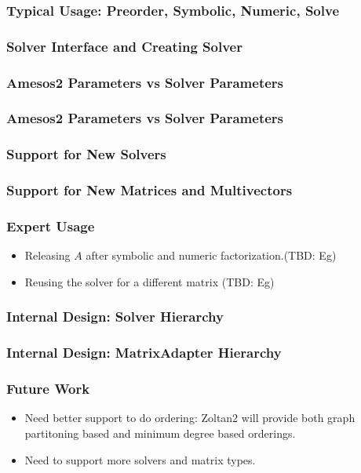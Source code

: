 \documentclass[xcolor=dvipsnames]{beamer}
\begin{document}
\begin{frame}
    \frametitle{Typical Usage: Preorder, Symbolic, Numeric, Solve}
\end{frame}

\begin{frame}
    \frametitle{Solver Interface and Creating Solver}
\end{frame}

\begin{frame}
    \frametitle{Amesos2 Parameters vs Solver Parameters}
\end{frame}

\begin{frame}
    \frametitle{Amesos2 Parameters vs Solver Parameters}
\end{frame}

\begin{frame}
    \frametitle{Support for New Solvers}
\end{frame}

\begin{frame}
    \frametitle{Support for New Matrices and Multivectors}
\end{frame}

\begin{frame}
    \frametitle{Expert Usage}
\begin{itemize}
    \item Releasing $A$ after symbolic and numeric factorization.(TBD: Eg)
    \item Reusing the solver for a different matrix (TBD: Eg)
\end{itemize}
\end{frame}

\begin{frame}
    \frametitle{Internal Design: Solver Hierarchy}
\end{frame}

\begin{frame}
    \frametitle{Internal Design: MatrixAdapter Hierarchy}
\end{frame}

\begin{frame}
    \frametitle{Future Work}
\begin{itemize}
    \item Need better support to do ordering: Zoltan2 will provide both
    graph partitoning based and minimum degree based orderings.
    \item Need to support more solvers and matrix types.
\end{itemize}
\end{frame}
\end{document}
